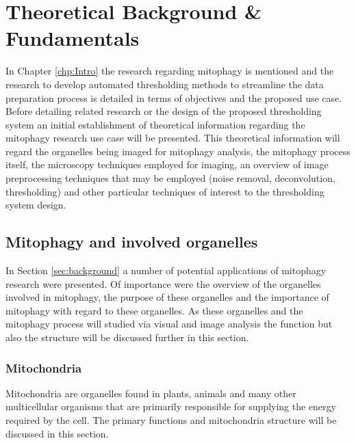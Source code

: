 \chapter{Theoretical Background \& Fundamentals}
\label{chp:Background}
In Chapter \ref{chp:Intro} the research regarding mitophagy is mentioned and the research to develop automated thresholding methods to streamline the data preparation process is detailed in terms of objectives and the proposed use case. Before detailing related research or the design of the proposed thresholding system an initial establishment of theoretical information regarding the mitophagy research use case will be presented. This theoretical information will regard the organelles being imaged for mitophagy analysis, the mitophagy process itself, the microscopy techniques employed for imaging, an overview of image preprocessing techniques that may be employed (noise removal, deconvolution, thresholding) and other particular techniques of interest to the thresholding system design.

\section{Mitophagy and involved organelles}\label{sec:mito_detail}
In Section \ref{sec:background} a number of potential applications of mitophagy research were presented. Of importance were the overview of the organelles involved in mitophagy, the purpose of these organelles and the importance of mitophagy with regard to these organelles. As these organelles and the mitophagy process will studied via visual and image analysis the function but also the structure will be discussed further in this section.
\subsection{Mitochondria}\label{sec:mitochondria}
Mitochondria are organelles found in plants, animals and many other multicellular organisms that are primarily responsible for supplying the energy required by the cell. The primary functions and mitochondria structure will be discussed in this section.
